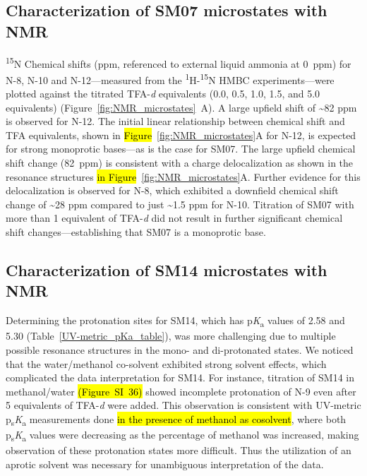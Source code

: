 \documentclass[9pt,lineno]{elife}
\newcommand{\pKa}{p\textit{K}\textsubscript{a}}
\newcommand{\psKa}{p\textsubscript{s}\textit{K}\textsubscript{a}}
\begin{document}
\subsection{Characterization of SM07 microstates with NMR}

\textsuperscript{15}N Chemical shifts (ppm, referenced to external liquid ammonia at 0~ppm) for N-8, N-10 and N-12---measured from the \textsuperscript{1}H-\textsuperscript{15}N HMBC experiments---were plotted against the titrated TFA-\textit{d} equivalents (0.0, 0.5, 1.0, 1.5, and 5.0 equivalents) (Figure~\ref{fig:NMR_microstates}~A). 
A large upfield shift of \textasciitilde82 ppm is observed for N-12. 
The initial linear relationship between chemical shift and TFA equivalents, shown in \hl{Figure}~\ref{fig:NMR_microstates}A for N-12, is expected for strong monoprotic bases---as is the case for SM07. 
The large upfield chemical shift change (82~ppm) is consistent with a charge delocalization as shown in the resonance structures \hl{in Figure}~\ref{fig:NMR_microstates}A. 
Further evidence for this delocalization is observed for N-8, which exhibited a downfield chemical shift change of \textasciitilde28 ppm compared to just \textasciitilde1.5 ppm for N-10. 
Titration of SM07 with more than 1 equivalent of TFA-\textit{d} did not result in further significant chemical shift changes---establishing that SM07 is a monoprotic base.

\subsection{Characterization of SM14 microstates with NMR}

Determining the protonation sites for SM14, which has \pKa{} values of 2.58 and 5.30 (Table~\ref{UV-metric_pKa_table}), was more challenging due to multiple possible resonance structures in the mono- and di-protonated states. 
We noticed that the water/methanol co-solvent exhibited strong solvent effects, which complicated the data interpretation for SM14. 
For instance, titration of SM14 in methanol/water \hl{(Figure~SI~36)} showed incomplete protonation of N-9 even after 5 equivalents of TFA-\textit{d} were added. 
This observation is consistent with UV-metric \psKa{} measurements done \hl{in the presence of methanol as cosolvent}, where both \psKa{} values were decreasing as the percentage of methanol was increased, making observation of these protonation states more difficult. 
Thus the utilization of an aprotic solvent was necessary for unambiguous interpretation of the data.
\end{document}
